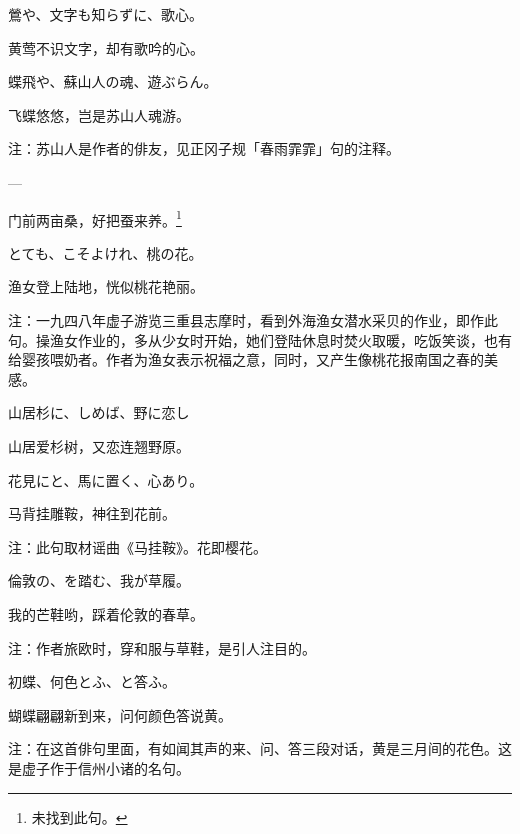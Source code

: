 \begin{haiku}
    {\FH 鶯や、文字も知らずに、歌心。}

    {\FK 黄莺不识文字，却有歌吟的心。}
\end{haiku}

\begin{haiku}
    {\FH 蝶飛や、蘇山人の魂、遊ぶらん。}

    {\FK 飞蝶悠悠，岂是苏山人魂游。}

    {\FT 注：苏山人是作者的俳友，见正冈子规「春雨霏霏」句的注释。}
\end{haiku}

\begin{haiku}
    {\FH ---}

    {\FK 门前两亩桑，好把蚕来养。\footnote{\FT 未找到此句。}}
\end{haiku}

\begin{haiku}
    {\FH {}とても、こそよけれ、桃の花。}

    {\FK 渔女登上陆地，恍似桃花艳丽。}

    {\FT 注：一九四八年虚子游览三重县志摩时，看到外海渔女潜水采贝的作业，即作此句。操渔女作业的，多从少女时开始，她们登陆休息时焚火取暖，吃饭笑谈，也有给婴孩喂奶者。作者为渔女表示祝福之意，同时，又产生像桃花报南国之春的美感。}
\end{haiku}

\begin{haiku}
    {\FH 山居杉に、しめば、野に恋し}

    {\FK 山居爱杉树，又恋连翘野原。}
\end{haiku}

\begin{haiku}
    {\FH 花見にと、馬に置く、心あり。}

    {\FK 马背挂雕鞍，神往到花前。}

    {\FT 注：此句取材谣曲《马挂鞍》。花即樱花。}
\end{haiku}

\begin{haiku}
    {\FH 倫敦の、を踏む、我が草履。}

    {\FK 我的芒鞋哟，踩着伦敦的春草。}

    {\FT 注：作者旅欧时，穿和服与草鞋，是引人注目的。}
\end{haiku}

\begin{haiku}
    {\FH 初蝶、何色とふ、と答ふ。}

    {\FK 蝴蝶翩翩新到来，问何颜色答说黄。}

    {\FT 注：在这首俳句里面，有如闻其声的来、问、答三段对话，黄是三月间的花色。这是虚子作于信州小诸的名句。}
\end{haiku}

